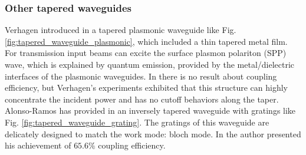 \subsubsection*{Other tapered waveguides}
Verhagen introduced in \cite{tapered_plasmonic_waveguides} a tapered plasmonic waveguide like Fig. \ref{fig:tapered_waveguide_plasmonic}, which included a thin tapered metal film. For transmission input beams can excite the surface plasmon polariton (SPP) wave, which is explained by quantum emission, provided by the metal/dielectric interfaces of the plasmonic waveguides. In \cite{tapered_plasmonic_waveguides} there is no result about coupling efficiency, but Verhagen's experiments exhibited that this structure can highly concentrate the incident power and has no cutoff behaviors along the taper.\\


Alonso-Ramos has provided in \cite{fiber_to_chip_grating_waveguides} an inversely tapered waveguide with gratings like Fig. \ref{fig:tapered_waveguide_grating}. The gratings of this waveguide are delicately designed to match the work mode: bloch mode. In \cite{fiber_to_chip_grating_waveguides} the author presented his achievement of $65.6\%$ coupling efficiency. \\

